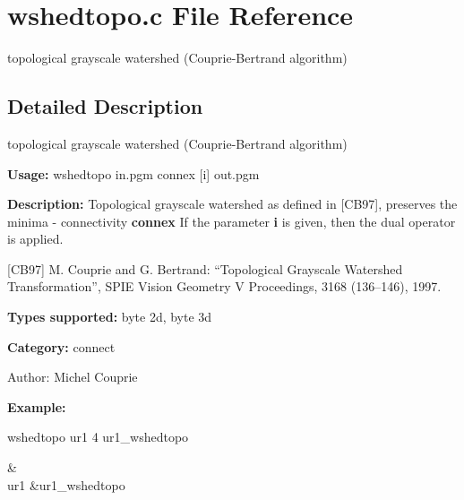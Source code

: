 \section{wshedtopo.c File Reference}
\label{wshedtopo_8c}
topological grayscale watershed (Couprie-Bertrand algorithm)  




\label{_details}
\subsection{Detailed Description}
topological grayscale watershed (Couprie-Bertrand algorithm) 

{\bf Usage:} wshedtopo in.pgm connex [i] out.pgm

{\bf Description:} Topological grayscale watershed as defined in [CB97], preserves the minima - connectivity {\bf connex} If the parameter {\bf i} is given, then the dual operator is applied.

[CB97] M. Couprie and G. Bertrand: ``Topological Grayscale Watershed Transformation'', SPIE Vision Geometry V Proceedings, 3168 (136--146), 1997.

{\bf Types supported:} byte 2d, byte 3d

{\bf Category:} connect

\begin{Desc}
\item[Author:]Michel Couprie\end{Desc}
{\bf Example:}

wshedtopo ur1 4 ur1\_\-wshedtopo

\begin{TabularC}{2}
\hline
 &  \\
ur1 &ur1\_\-wshedtopo  \\
\end{TabularC}
